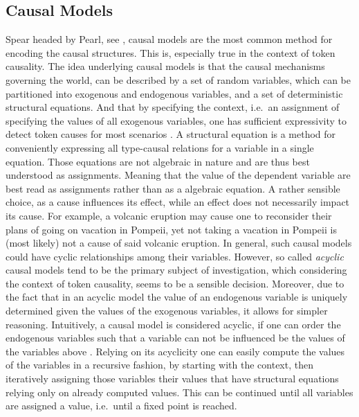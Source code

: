 \documentclass[11pt,a4paper]{book}
\theoremstyle{definition}
\theoremstyle{definition}
\theoremstyle{definition}
\theoremstyle{remark}
\begin{document}
\subsection{Causal Models}
Spear headed by Pearl, see  \parencite{pearl1995causal}, causal models are the most common method for encoding the causal structures. This is, especially true in the context of token causality. 
The idea underlying causal models is that the causal mechanisms governing the world, can be described by a set of random variables, which can be partitioned into exogenous and endogenous variables, and a set of deterministic structural equations. And that by specifying the context, i.e.\ an assignment of specifying the values of all exogenous variables, one has sufficient expressivity to detect token causes for most scenarios  \parencite{halpern2015cause}. 
%
A structural equation is a method for conveniently expressing all type-causal relations for a variable in a single equation.
Those equations are not algebraic in nature and are thus best understood as assignments. Meaning that the value of the dependent variable are best read as assignments rather than as a algebraic equation. A rather sensible choice, as a cause influences its effect, while an effect does not necessarily impact its cause. For example, a volcanic eruption may cause one to reconsider their plans of going on vacation in Pompeii, yet not taking a vacation in Pompeii is (most likely) not a cause of said volcanic eruption. 
In general, such causal models could have cyclic relationships among their variables. However, so called \emph{acyclic} causal models tend to be the primary subject of investigation, which considering the context of token causality, seems to be a sensible decision. Moreover, due to the fact that in an acyclic model the value of an endogenous variable is uniquely determined given the values of the exogenous variables, it allows for simpler reasoning. Intuitively, a causal model is considered acyclic, if one can order the endogenous variables such that a variable can not be influenced be the values of the variables above \cite{halpern2015cause}.   
Relying on its acyclicity one can easily compute the values of the variables in a recursive fashion, by starting with the context, then iteratively assigning those variables their values that have structural equations relying only on already computed values. This can be continued until all variables are assigned a value, i.e.\ until a fixed point is reached.
\end{document}
